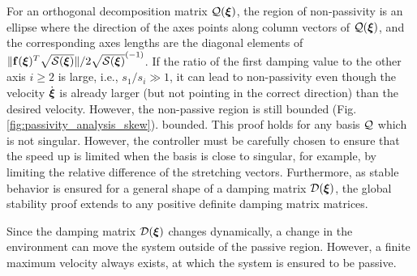For an orthogonal decomposition matrix $\mathcal{Q}(\boldsymbol{{\boldsymbol{\xi}}})$, the region of non-passivity is an ellipse where the direction of the axes points along column vectors of $\mathcal{Q}({\boldsymbol{\xi}})$, and the corresponding axes lengths are the diagonal elements of $\| \mathbf{f}({\boldsymbol{\xi}})^T \sqrt{\mathcal{S}({\boldsymbol{\xi}})}\| / 2 \sqrt{\mathcal{S}({\boldsymbol{\xi}})}^{(-1)}$. 
If the ratio of the first damping value to the other axis $i \geq 2$ is large, i.e., $s_1 / s_i \gg 1$, it can lead to non-passivity even though the velocity $\dot{\boldsymbol{\xi}}$ is already larger (but not pointing in the correct direction) than the desired velocity. However, the non-passive region is still \iflong bounded (Fig.\ref{fig:passivity_analysis_skew}). \else bounded. \fi
This proof holds for any basis $\mathcal{Q}$ which is not singular. However, the controller must be carefully chosen to ensure that the speed up is limited when the basis is close to singular, for example, by limiting the relative difference of the stretching vectors. Furthermore, as stable behavior is ensured for a general shape of a damping matrix $\mathcal{D}(\boldsymbol{\xi})$, the global stability proof extends to any positive definite damping matrix matrices.

Since the damping matrix $\mathcal{D}(\boldsymbol{\xi})$ changes dynamically, a change in the environment can move the system outside of the passive region. However, a finite maximum velocity always exists, at which the system is ensured to be passive.

